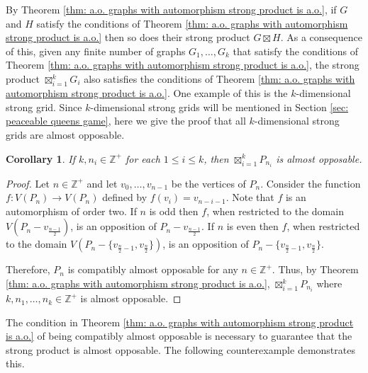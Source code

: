 \documentclass[11pt]{article}
\newtheorem{corollary}[theorem]{Corollary}
\theoremstyle{definition}
\begin{document}
By Theorem \ref{thm: a.o. graphs with automorphism strong product is a.o.}, if
$G$ and $H$ satisfy the conditions of Theorem \ref{thm: a.o. graphs with
automorphism strong product is a.o.} then so does their strong product
$G\boxtimes H$. As a consequence of this, given any finite number of graphs
$G_1, \dots, G_k$ that satisfy the conditions of Theorem \ref{thm: a.o. graphs
with automorphism strong product is a.o.}, the strong product
$\boxtimes^k_{i=1} G_i$ also satisfies the conditions of Theorem \ref{thm: a.o.
graphs with automorphism strong product is a.o.}. One example of this is the
$k$-dimensional strong grid. Since $k$-dimensional strong grids will be
mentioned in Section \ref{sec: peaceable queens game}, here we give the proof
that all $k$-dimensional strong grids are almost opposable. 

\begin{corollary}
    \label{cor: strong grid is a.o.}
    If $k, n_i\in \mathbb{Z}^+$ for each $1\leq i\leq k$, then
    $\boxtimes_{i=1}^k P_{n_i}$ is almost opposable.  
\end{corollary}

\begin{proof}
    Let $n\in \mathbb{Z}^+$ and let $v_0, \dots, v_{n-1}$ be the vertices of
    $P_n$. Consider the function $f: V(P_n) \to V(P_n)$ defined by $f(v_i) =
    v_{n-i-1}$. Note that $f$ is an automorphism of order two. If $n$ is odd
    then $f$, when restricted to the domain $V(P_n - v_{\frac{n-1}{2}})$, is an
    opposition of $P_n - v_{\frac{n-1}{2}}$. If $n$ is even then $f$, when
    restricted to the domain $V(P_n-\{v_{\frac{n}{2}-1},v_{\frac{n}{2}}\})$, is
    an opposition of $P_n-\{v_{\frac{n}{2}-1},v_{\frac{n}{2}}\}$.

    Therefore, $P_n$ is compatibly almost opposable for any $n\in
    \mathbb{Z}^+$. Thus, by Theorem \ref{thm: a.o. graphs with automorphism
    strong product is a.o.}, $\boxtimes^k_{i=1} P_{n_i}$ where $k, n_1, \dots,
    n_k \in \mathbb{Z}^+$ is almost opposable. 
\end{proof}

The condition in Theorem \ref{thm: a.o. graphs with automorphism strong product
is a.o.} of being compatibly almost opposable is necessary to guarantee that
the strong product is almost opposable. The following counterexample
demonstrates this. 
\end{document}
